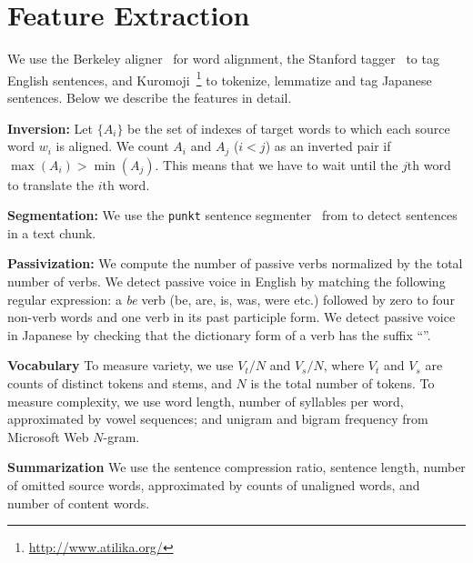 \appendix


\section{Feature Extraction}
\label{sec:features}

We use the Berkeley aligner~\cite{berkeleyaligner} for word alignment,
the Stanford  tagger~\cite{stanford-tagger} to tag English
sentences, and Kuromoji~\footnote{\url{http://www.atilika.org/}} to
tokenize, lemmatize and tag Japanese sentences.  Below we describe the
features in detail.

\noindent
\textbf{Inversion:} Let $\{A_i\}$ be the set of indexes of target
words to which each source word $w_i$ is aligned.  We count $A_i$ and
$A_j$ ($i < j$) as an inverted pair if $\max(A_i) > \min(A_j)$.  This
means that we have to wait until the $j$th word to translate the $i$th
word.

\noindent
\textbf{Segmentation:}
We use the \texttt{punkt} sentence segmenter~\cite{kiss06segmenter}
from  to detect sentences in a text chunk.
















\noindent
\textbf{Passivization:}
We compute the number of passive verbs normalized by the total number
of verbs.  We detect passive voice in English by matching the
following regular expression: a \emph{be} verb (be, are, is, was, were
etc.) followed by zero to four non-verb words and one verb in its past
participle form.  We detect passive voice in Japanese by checking that
the dictionary form of a verb has the suffix ``''.









\noindent
\textbf{Vocabulary}
  To measure variety, we use $V_t/N$ and $V_s/N$, where $V_t$ and
  $V_s$ are counts of distinct tokens and stems, and $N$ is the total
  number of tokens.  To measure complexity, we use word length, number
  of syllables per word, approximated by vowel sequences; and unigram
  and bigram frequency from Microsoft Web $N$-gram.

\noindent
\textbf{Summarization}
We use the sentence compression ratio, sentence length, number of
omitted source words, approximated by counts of unaligned words, and
number of content words.